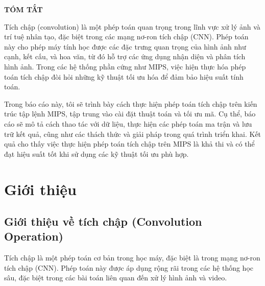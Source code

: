 \documentclass{article}
\begin{document}
\newpage
\begin{center}
	\fontsize{18pt}{1pt} \selectfont \textbf{TÓM TẮT}
\end{center}
\begin{flushleft}
	\large
	\justifying
	\hspace{0.4cm} Tích chập (convolution) là một phép toán quan trọng trong lĩnh vực xử lý ảnh và trí tuệ nhân tạo, đặc biệt trong các mạng nơ-ron tích chập (CNN). Phép toán này cho phép máy tính học được các đặc trưng quan trọng của hình ảnh như cạnh, kết cấu, và hoa văn, từ đó hỗ trợ các ứng dụng nhận diện và phân tích hình ảnh. Trong các hệ thống phần cứng như MIPS, việc hiện thực hóa phép toán tích chập đòi hỏi những kỹ thuật tối ưu hóa để đảm bảo hiệu suất tính toán.
\end{flushleft}
\begin{flushleft}
	\large
	\justifying
	\hspace{0.4cm} Trong báo cáo này, tôi sẽ trình bày cách thực hiện phép toán tích chập trên kiến trúc tập lệnh MIPS, tập trung vào cài đặt thuật toán và tối ưu mã. Cụ thể, báo cáo sẽ mô tả cách thao tác với dữ liệu, thực hiện các phép toán ma trận và lưu trữ kết quả, cũng như các thách thức và giải pháp trong quá trình triển khai. Kết quả cho thấy việc thực hiện phép toán tích chập trên MIPS là khả thi và có thể đạt hiệu suất tốt khi sử dụng các kỹ thuật tối ưu phù hợp.
\end{flushleft}
\thispagestyle{empty}
\clearpage



\thispagestyle{empty}
\tableofcontents
\thispagestyle{empty}
\clearpage
\large


\newpage
{}
\clearpage
\section*{Giới thiệu}
\setcounter{section}{1}\setlength{\baselineskip}{15pt}
\setcounter{subsection}{0}
\setcounter{subsubsection}{0}
\large
{} %

\subsection{Giới thiệu về tích chập (Convolution Operation)}
\large
\hspace{0.4cm} Tích chập là một phép toán cơ bản trong học máy, đặc biệt là trong mạng nơ-ron tích chập (CNN). Phép toán này được áp dụng rộng rãi trong các hệ thống học sâu, đặc biệt trong các bài toán liên quan đến xử lý hình ảnh và video.\medskip
\end{document}
